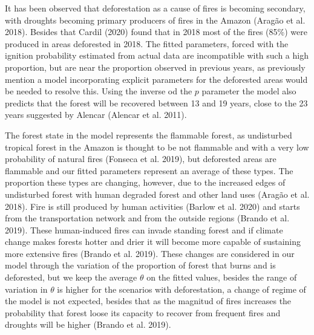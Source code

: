\documentclass[
]{article}
\begin{document}
It has been observed that deforestation as a cause of fires is becoming
secondary, with droughts becoming primary producers of fires in the
Amazon (Aragão et al. 2018). Besides that Cardil (2020) found that in
2018 most of the fires (85\%) were produced in areas deforested in 2018.
The fitted parameters, forced with the ignition probability estimated
from actual data are incompatible with such a high proportion, but are
near the proportion observed in previous years, as previously mention a
model incorporating explicit parameters for the deforested areas would
be needed to resolve this. Using the inverse od the \(p\) parameter the
model also predicts that the forest will be recovered between 13 and 19
years, close to the 23 years suggested by Alencar (Alencar et al. 2011).

The forest state in the model represents the flammable forest, as
undisturbed tropical forest in the Amazon is thought to be not flammable
and with a very low probability of natural fires (Fonseca et al. 2019),
but deforested areas are flammable and our fitted parameters represent
an average of these types. The proportion these types are changing,
however, due to the increased edges of undisturbed forest with human
degraded forest and other land uses (Aragão et al. 2018). Fire is still
produced by human activities (Barlow et al. 2020) and starts from the
transportation network and from the outside regions (Brando et al.
2019). These human-induced fires can invade standing forest and if
climate change makes forests hotter and drier it will become more
capable of sustaining more extensive fires (Brando et al. 2019). These
changes are considered in our model through the variation of the
proportion of forest that burns and is deforested, but we keep the
average \(\theta\) on the fitted values, besides the range of variation
in \(\theta\) is higher for the scenarios with deforestation, a change
of regime of the model is not expected, besides that as the magnitud of
fires increases the probability that forest loose its capacity to
recover from frequent fires and droughts will be higher (Brando et al.
2019).
\end{document}

